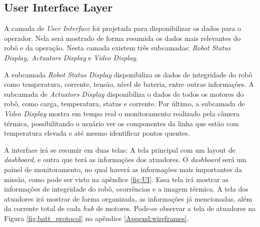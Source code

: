 \subsection{User Interface Layer}

A camada de \textit{User Interface} foi projetada para disponibilizar os dados para o operador. Nela será mostrado de forma resumida os dados mais relevantes do robô e da operação. Nesta camada existem três subcamadas: \textit{Robot Status Display, Actuators Display} e \textit{Video Display}. 

A subcamada \textit{Robot Status Display} disponibiliza os dados de integridade do robô como temperatura, corrente, tensão, nível de bateria, entre outras informações. A subcamada de \textit{Actuators Display} disponibiliza o dados de todos os motores do robô, como carga, temperatura, status e corrente. Por último, a subcamada de \textit{Video Display} mostra em tempo real o monitoramento realizado pela câmera térmica, possibilitando o usuário ver os componentes da linha que estão com temperatura elevada e até mesmo identificar pontos quentes.

A interface irá se resumir em duas telas: A tela principal com um layout de \textit{dashboard}, e outra que terá as informações dos atuadores. O \textit{dashboard} será um painel de monitoramento, no qual haverá as informações mais importantes da missão, como pode ser visto na apêndice \ref{fig:UI}. Essa tela irá mostrar as informações de integridade do robô, ocorrências e a imagem térmica. A tela dos atuadores irá mostrar de forma organizada, as informações já mencionadas, além da corrente total de cada \textit{hub} de motores. Pode-se observar a tela de atuadores na Figura \ref{fig:batt_protocol} no apêndice \ref{Append:wireframes}.




